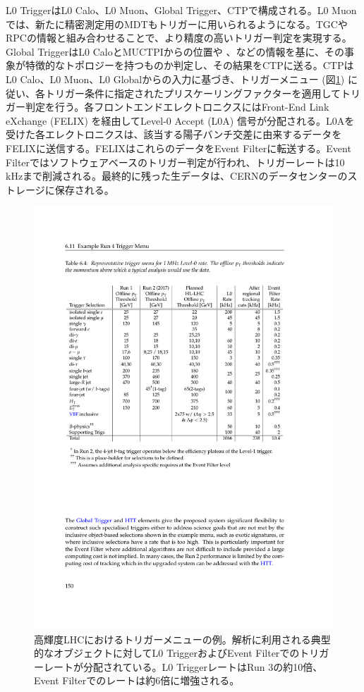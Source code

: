L0 TriggerはL0 Calo、L0 Muon、Global Trigger、CTPで構成される。L0 Muonでは、新たに精密測定用のMDTもトリガーに用いられるようになる。TGCやRPCの情報と組み合わせることで、より精度の高いトリガー判定を実現する。Global TriggerはL0 CaloとMUCTPIからの位置や \pt、\Et などの情報を基に、その事象が特徴的なトポロジーを持つものか判定し、その結果をCTPに送る。CTPはL0 Calo、L0 Muon、L0 Globalからの入力に基づき、トリガーメニュー (図\ref{Phase2_Triggermenu}) に従い、各トリガー条件に指定されたプリスケーリングファクターを適用してトリガー判定を行う。各フロントエンドエレクトロニクスにはFront-End Link eXchange  (FELIX) を経由してLevel-0 Accept (L0A) 信号が分配される。L0Aを受けた各エレクトロニクスは、該当する陽子バンチ交差に由来するデータをFELIXに送信する。FELIXはこれらのデータをEvent Filterに転送する。Event Filterではソフトウェアベースのトリガー判定が行われ、トリガーレートは10 kHzまで削減される。最終的に残った生データは、CERNのデータセンターのストレージに保存される。

\begin{figure} 
\centering
\includegraphics[width=16cm]{fig/Intro/Phase2_Triggermenu.pdf}
\caption[高輝度LHCにおけるトリガーメニューの例]{高輝度LHCにおけるトリガーメニューの例\cite{tdr_phase2tdaq_2017020}。解析に利用される典型的なオブジェクトに対してL0 TriggerおよびEvent Filterでのトリガーレートが分配されている。L0 TriggerレートはRun 3の約10倍、Event Filterでのレートは約6倍に増強される。}
\label{Phase2_Triggermenu}
\end{figure}

